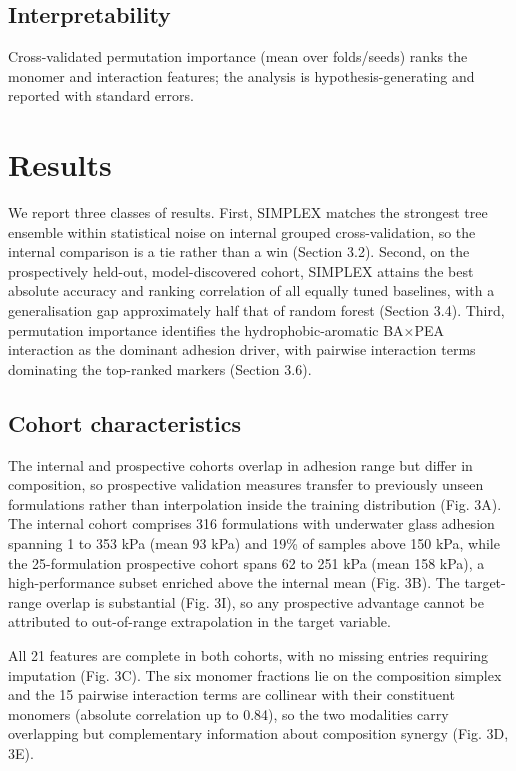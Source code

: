 \documentclass[utf8]{FrontiersinHarvard}
\begin{document}
\subsection{Interpretability}
Cross-validated permutation importance (mean over folds/seeds) ranks the monomer and interaction features; the analysis is hypothesis-generating and reported with standard errors.

\section{Results}

We report three classes of results. First, SIMPLEX matches the strongest tree ensemble within statistical noise on internal grouped cross-validation, so the internal comparison is a tie rather than a win (Section 3.2). Second, on the prospectively held-out, model-discovered cohort, SIMPLEX attains the best absolute accuracy and ranking correlation of all equally tuned baselines, with a generalisation gap approximately half that of random forest (Section 3.4). Third, permutation importance identifies the hydrophobic-aromatic BA$\times$PEA interaction as the dominant adhesion driver, with pairwise interaction terms dominating the top-ranked markers (Section 3.6).

\subsection{Cohort characteristics}

The internal and prospective cohorts overlap in adhesion range but differ in composition, so prospective validation measures transfer to previously unseen formulations rather than interpolation inside the training distribution (Fig. 3A). The internal cohort comprises 316 formulations with underwater glass adhesion spanning 1 to 353 kPa (mean 93 kPa) and 19\% of samples above 150 kPa, while the 25-formulation prospective cohort spans 62 to 251 kPa (mean 158 kPa), a high-performance subset enriched above the internal mean (Fig. 3B). The target-range overlap is substantial (Fig. 3I), so any prospective advantage cannot be attributed to out-of-range extrapolation in the target variable.

All 21 features are complete in both cohorts, with no missing entries requiring imputation (Fig. 3C). The six monomer fractions lie on the composition simplex and the 15 pairwise interaction terms are collinear with their constituent monomers (absolute correlation up to 0.84), so the two modalities carry overlapping but complementary information about composition synergy (Fig. 3D, 3E).
\end{document}
